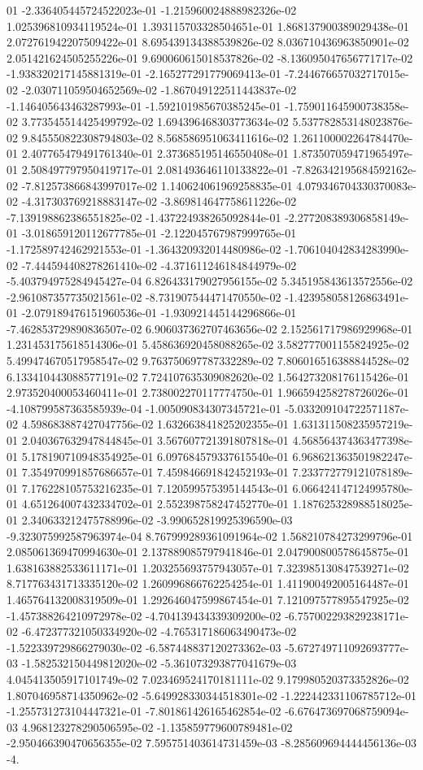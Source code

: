 01	-2.336405445724522023e-01	-1.215960024888982326e-02	1.025396810934119524e-01	1.393115703328504651e-01	1.868137900389029438e-01	2.072761942207509422e-01	8.695439134388539826e-02	8.036710436963850901e-02	2.051421624505255226e-01	9.690060615018537826e-02	-8.136095047656771717e-02	-1.938320217145881319e-01	-2.165277291779069413e-01	-7.244676657032717015e-02	-2.030711059504652569e-02	-1.867049122511443837e-02	-1.146405643463287993e-01	-1.592101985670385245e-01	-1.759011645900738358e-02	3.773545514425499792e-02	1.694396468303773634e-02	5.537782853148023876e-02	9.845550822308794803e-02	8.568586951063411616e-02	1.261100002264784470e-01	2.407765479491761340e-01	2.373685195146550408e-01	1.873507059471965497e-01	2.508497797950419717e-01	2.081493646110133822e-01	-7.826342195684592162e-02	-7.812573866843997017e-02	1.140624061969258835e-01	4.079346704330370083e-02	-4.317303769218883147e-02	-3.869814647758611226e-02	-7.139198862386551825e-02	-1.437224938265092844e-01	-2.277208389306858149e-01	-3.018659120112677785e-01	-2.122045767987999765e-01	-1.172589742462921553e-01	-1.364320932014480986e-02	-1.706104042834283990e-02	-7.444594408278261410e-02	-4.371611246184844979e-02	-5.403794975284945427e-04	6.826433179027956155e-02	5.345195843613572556e-02	-2.961087357735021561e-02	-8.731907544471470550e-02	-1.423958058126863491e-01	-2.079189476151960536e-01	-1.930921445144296866e-01	-7.462853729890836507e-02	6.906037362707463656e-02	2.152561717986929968e-01	1.231453175618514306e-01	5.458636920458088265e-02	3.582777001155824925e-02	5.499474670517958547e-02	9.763750697787332289e-02	7.806016516388844528e-02	6.133410443088577191e-02	7.724107635309082620e-02	1.564273208176115426e-01	2.973520400053460411e-01	2.738002270117774750e-01	1.966594258278726026e-01	-4.108799587363585939e-04	-1.005090834307345721e-01	-5.033209104722571187e-02	4.598683887427047756e-02	1.632663841825202355e-01	1.631311508235957219e-01	2.040367632947844845e-01	3.567607721391807818e-01	4.568564374363477398e-01	5.178190710948354925e-01	6.097684579337615540e-01	6.968621363501982247e-01	7.354970991857686657e-01	7.459846691842452193e-01	7.233772779121078189e-01	7.176228105753216235e-01	7.120599575395144543e-01	6.066424147124995780e-01	4.651264007432334702e-01	2.552398758247452770e-01	1.187625328988518025e-01	2.340633212475788996e-02	-3.990652819925396590e-03	-9.323075992587963974e-04	8.767999289361091964e-02	1.568210784273299796e-01	2.085061369470994630e-01	2.137889085797941846e-01	2.047900800578645875e-01	1.638163882533611171e-01	1.203255693757943057e-01	7.323985130847539271e-02	8.717763431713335120e-02	1.260996866762254254e-01	1.411900492005164487e-01	1.465764132008319509e-01	1.292646047599867454e-01	7.121097577895547925e-02	-1.457388264210972978e-02	-4.704139434339309200e-02	-6.757002293829238171e-02	-6.472377321050334920e-02	-4.765317186063490473e-02	-1.522339729866279030e-02	-6.587448837120273362e-03	-5.672749711092693777e-03	-1.582532150449812020e-02	-5.361073293877041679e-03	4.045413505917101749e-02	7.023469524170181111e-02	9.179980520373352826e-02	1.807046958714350962e-02	-5.649928330344518301e-02	-1.222442331106785712e-01	-1.255731273104447321e-01	-7.801861426165462854e-02	-6.676473697068759094e-03	4.968123278290506595e-02	-1.135859779600789481e-02	-2.950466390470656355e-02	7.595751403614731459e-03	-8.285609694444456136e-03	-4.